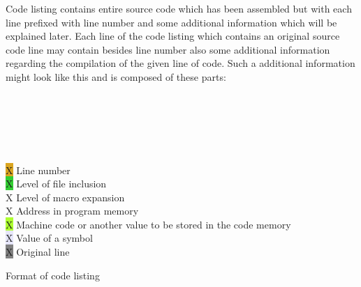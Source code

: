     Code listing contains entire source code which has been assembled but with each line prefixed with line number and some additional information which will be explained later. Each line of the code listing which contains an original source code line may contain besides line number also some additional information regarding the compilation of the given line of code. Such a additional information might look like this and is composed of these parts:

    \begin{code}[h]
        \verb'  '{\color{Lavender}{0055}}\verb'                  '{\color{Goldenrod}{18}}\verb'      '{\color{Gray}{X      data     55h}}\\
        {\color{Apricot}{0014}}\verb' '{\color{GreenYellow}{1122}}\verb'       '{\color{LimeGreen}{=1}}\verb'      '{\color{Goldenrod}{33}}\verb'      '{\color{Gray}{l:     inc      s0}}\\
        \verb'                        '{\color{Goldenrod}{35}}\verb' '{\color{ProcessBlue}{+1}}\verb'   '{\color{Gray}{abc     ; Expand macro ``abc'' here}}\\
        {\color{Apricot}{001E}}\verb' '{\color{GreenYellow}{E580}}\verb'               '{\color{Goldenrod}{36}}\verb' '{\color{ProcessBlue}{+1}}\verb'  '{\color{Gray}{                LOAD     s1, s0}}\\
        {\color{Apricot}{0020}}\verb' '{\color{GreenYellow}{F410}}\verb'               '{\color{Goldenrod}{37}}\verb' '{\color{ProcessBlue}{+1}}\verb'  '{\color{Gray}{                SR0     s1}}\\
        {\color{Apricot}{0021}}\verb' '{\color{GreenYellow}{F590}}\verb'               '{\color{Goldenrod}{38}}\verb' '{\color{ProcessBlue}{+1}}\verb'  '{\color{Gray}{                LOAD     s2, s1}}\\

        \colorbox{Goldenrod}{\color{Goldenrod}X} Line number\\
        \colorbox{LimeGreen}{\color{LimeGreen}X} Level of file inclusion\\
        \colorbox{ProcessBlue}{\color{ProcessBlue}X} Level of macro expansion\\
        \colorbox{Apricot}{\color{Apricot}X} Address in program memory\\
        \colorbox{GreenYellow}{\color{GreenYellow}X} Machine code or another value to be stored in the code memory\\
        \colorbox{Lavender}{\color{Lavender}X} Value of a symbol\\
        \colorbox{Gray}{\color{Gray}X} Original line
        \caption{Format of code listing}
    \end{code}

